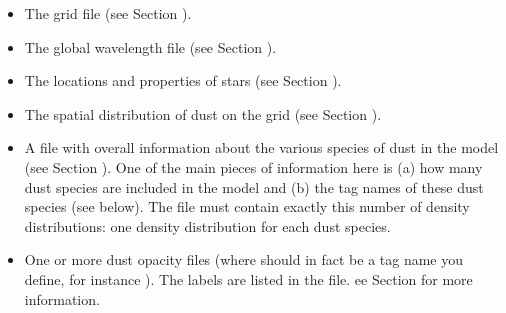 \documentclass[letterpaper,10pt,english]{sphinxmanual}
\begin{document}
\begin{itemize}
\item {} 
 The grid file (see Section {\hyperref[\detokenize{inputoutputfiles:sec-grid-input}]{}}).

\item {} 
 The global wavelength file (see Section
{\hyperref[\detokenize{inputoutputfiles:sec-wavelengths}]{}}).

\item {} 
 The locations and properties of stars (see Section
{\hyperref[\detokenize{inputoutputfiles:sec-stars}]{}}).

\item {} 
 The spatial distribution of dust on the grid (see
Section {\hyperref[\detokenize{inputoutputfiles:sec-dustdens}]{}}).

\item {} 
 A file with overall information about the various species of
dust in the model (see Section {\hyperref[\detokenize{inputoutputfiles:sec-opacities}]{}}).  One of the main pieces
of information here is (a) how many dust species are included in the model
and (b) the tag names of these dust species (see 
below). The file  must contain exactly this number of
density distributions: one density distribution for each dust species.

\item {} 
 One or more dust opacity files (where  should in
fact be a tag name you define, for instance ). The
labels are listed in the  file. ee Section
{\hyperref[\detokenize{inputoutputfiles:sec-opacities}]{}} for more information.


\end{itemize}
\end{document}
